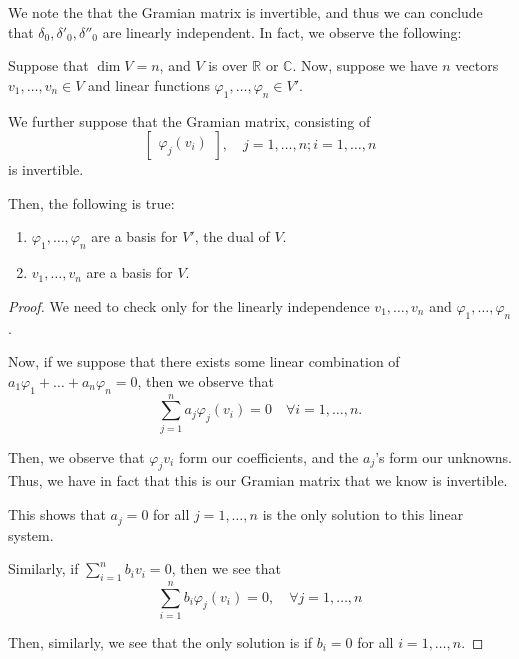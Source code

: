 \documentclass[openany]{book}
\newcommand{\CC}{\mathbb{C}}
\newcommand{\RR}{\mathbb{R}}
\begin{document}
We note the that the Gramian matrix is invertible, and thus we can conclude that $\delta_0, \delta'_{0}, \delta''_{0}$ are linearly independent. In fact, we observe the following:
\begin{thm}
	Suppose that $\dim V = n$, and $V$ is over $\RR$ or $\CC$. Now, suppose we have $n$ vectors $v_{1}, \ldots, v_{n} \in V$ and linear functions $\varphi_1, \ldots, \varphi_n \in V'$.
	
	We further suppose that the Gramian matrix, consisting of
	\begin{equation*}
		\begin{bmatrix}
			\varphi_{j}(v_{i})
		\end{bmatrix}, \quad j = 1,\ldots,n; i = 1, \ldots, n
	\end{equation*}
	is invertible.
	
	Then, the following is true:
	\begin{enumerate}
		\item $\varphi_1, \ldots, \varphi_n$ are a basis for $V'$, the dual of $V$.
		\item $v_{1}, \ldots, v_{n}$ are a basis for $V$.
	\end{enumerate}
	
\end{thm}
\begin{proof}
	We need to check only for the linearly independence $v_{1}, \ldots, v_{n}$ and $\varphi_1, \ldots, \varphi_n$.
	
	Now, if we suppose that there exists some linear combination of $a_{1}\varphi_1 + \ldots + a_{n}\varphi_n = 0$, then we observe that
	\begin{equation*}
		\sum_{j=1}^{n} a_{j}\varphi_j(v_{i}) = 0 \quad \forall i = 1, \ldots, n.
	\end{equation*}

	Then, we observe that $\varphi_jv_{i}$ form our coefficients, and the $a_{j}$'s form our unknowns. Thus, we have in fact that this is our Gramian matrix that we know is invertible. 
	
	This shows that $a_{j} = 0$ for all $j=1,\ldots,n$ is the only solution to this linear system.
	
	Similarly, if $\sum_{i=1}^{n} b_{i}v_{i} = 0$, then we see that
	\begin{equation*}
		\sum_{i=1}^{n} b_{i}\varphi_{j}(v_{i}) = 0, \quad \forall j = 1, \ldots,n
	\end{equation*}

	Then, similarly, we see that the only solution is if $b_{i} = 0$ for all $i = 1,\ldots, n$.
\end{proof}
\end{document}
